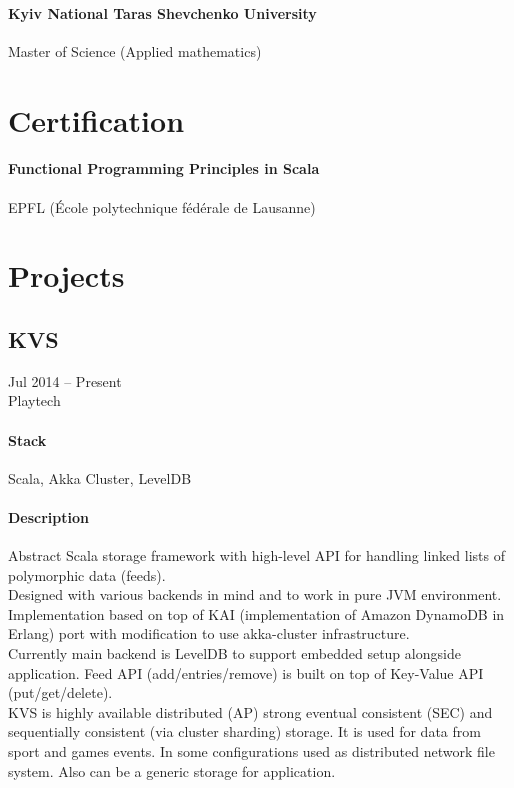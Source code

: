 \paragraph{Kyiv National Taras Shevchenko University}
Master of Science (Applied mathematics)

\section{Certification}
\paragraph{Functional Programming Principles in Scala}
EPFL (École polytechnique fédérale de Lausanne)

\section{Projects}
\subsection{KVS}
Jul 2014 – Present\\
Playtech\\
\paragraph{Stack} Scala, Akka Cluster, LevelDB
\paragraph{Description}
Abstract Scala storage framework with high-level API for handling linked lists of polymorphic data (feeds).\\
Designed with various backends in mind and to work in pure JVM environment. Implementation based on top of KAI (implementation of Amazon DynamoDB in Erlang) port with modification to use akka-cluster infrastructure.\\
Currently main backend is LevelDB to support embedded setup alongside application. Feed API (add/entries/remove) is built on top of Key-Value API (put/get/delete).\\
KVS is highly available distributed (AP) strong eventual consistent (SEC) and sequentially consistent (via cluster sharding) storage. It is used for data from sport and games events. In some configurations used as distributed network file system. Also can be a generic storage for application.

